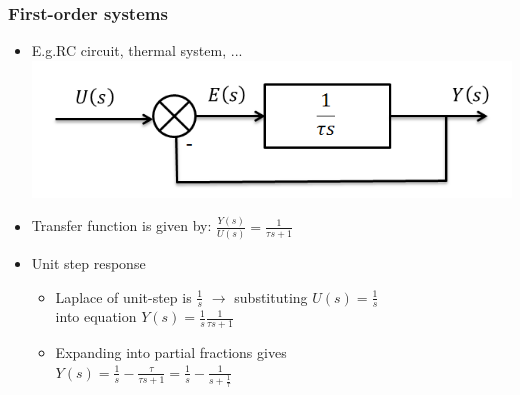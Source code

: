 \begin{frame}
\frametitle{First-order systems}
\begin{itemize}
\item E.g.RC circuit, thermal system, ...
\vspace{0.25cm}
\\ \includegraphics[width=0.7\linewidth]{Afbeelding1}
\vspace{0.5cm}
\item Transfer function is given by: $\frac{Y(s)}{U(s)} = \frac{1}{\tau s +1}$
\vspace{0.25cm}
\item Unit step response
\begin{itemize}
\vspace{0.25cm}
\item Laplace of unit-step is $\frac{1}{s}$ $\rightarrow$ substituting $U(s)= \frac{1}{s}$ \\
\vspace{0.25cm}
into equation $Y(s) = \frac{1}{s}\frac{1}{\tau s +1}$
\vspace{0.25cm}
\item Expanding into partial fractions gives
\vspace{0.25cm}
\\ $Y(s)= \frac{1}{s} - \frac{\tau}{\tau s +1} = \frac{1}{s} - \frac{1}{s+\frac{1}{\tau}}$
 \end{itemize}
\end{itemize}
\end{frame}

